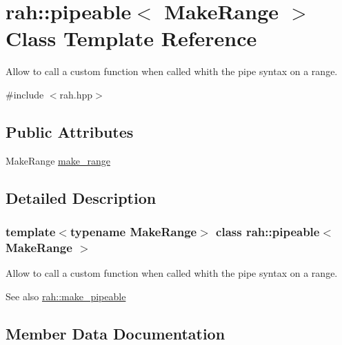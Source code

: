 \hypertarget{structrah_1_1pipeable}{}\section{rah\+::pipeable$<$ Make\+Range $>$ Class Template Reference}
\label{structrah_1_1pipeable}


Allow to call a custom function when called whith the \textquotesingle{}pipe\textquotesingle{} syntax on a range.  




{\ttfamily \#include $<$rah.\+hpp$>$}

\subsection*{Public Attributes}
\begin{DoxyCompactItemize}
\item 
Make\+Range \mbox{\hyperlink{structrah_1_1pipeable_aebc25016787b2e3c437ceb322705ed47}{make\+\_\+range}}
\end{DoxyCompactItemize}


\subsection{Detailed Description}
\subsubsection*{template$<$typename Make\+Range$>$\newline
class rah\+::pipeable$<$ Make\+Range $>$}

Allow to call a custom function when called whith the \textquotesingle{}pipe\textquotesingle{} syntax on a range. 

\begin{DoxySeeAlso}{See also}
\mbox{\hyperlink{namespacerah_a274b78c4c0af5dd58ce280f02223fb55}{rah\+::make\+\_\+pipeable}} 
\end{DoxySeeAlso}


\subsection{Member Data Documentation}
\mbox{\label{structrah_1_1pipeable_aebc25016787b2e3c437ceb322705ed47}} 
